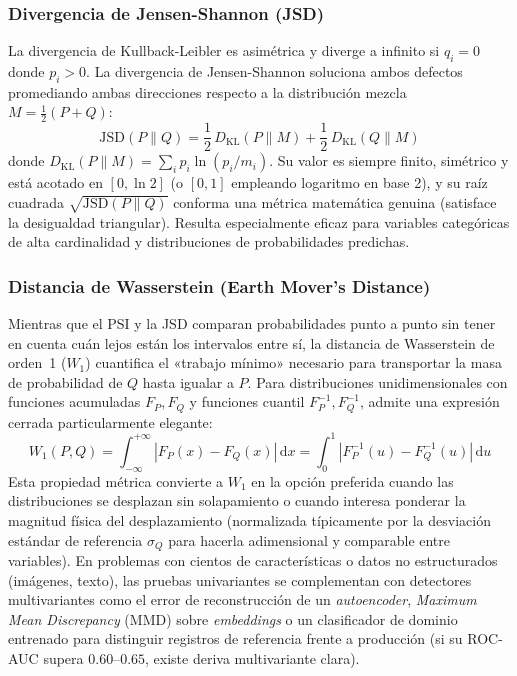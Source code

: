 \subsubsection{Divergencia de Jensen-Shannon (JSD)}

La divergencia de Kullback-Leibler es asimétrica y diverge a infinito si $q_i = 0$ donde $p_i > 0$. La divergencia de Jensen-Shannon soluciona ambos defectos promediando ambas direcciones respecto a la distribución mezcla $M = \frac{1}{2}(P + Q)$:
\begin{equation}\label{eq:jsd}
\text{JSD}(P \parallel Q) = \frac{1}{2}\, D_{\text{KL}}(P \parallel M) + \frac{1}{2}\, D_{\text{KL}}(Q \parallel M)
\end{equation}
donde $D_{\text{KL}}(P \parallel M) = \sum_i p_i \ln(p_i / m_i)$. Su valor es siempre finito, simétrico y está acotado en $[0, \ln 2]$ (o $[0, 1]$ empleando logaritmo en base 2), y su raíz cuadrada $\sqrt{\text{JSD}(P \parallel Q)}$ conforma una métrica matemática genuina (satisface la desigualdad triangular). Resulta especialmente eficaz para variables categóricas de alta cardinalidad y distribuciones de probabilidades predichas.

\subsubsection{Distancia de Wasserstein (Earth Mover's Distance)}

Mientras que el PSI y la JSD comparan probabilidades punto a punto sin tener en cuenta cuán lejos están los intervalos entre sí, la distancia de Wasserstein de orden~1 ($W_1$) cuantifica el «trabajo mínimo» necesario para transportar la masa de probabilidad de $Q$ hasta igualar a $P$. Para distribuciones unidimensionales con funciones acumuladas $F_P, F_Q$ y funciones cuantil $F_P^{-1}, F_Q^{-1}$, admite una expresión cerrada particularmente elegante:
\begin{equation}\label{eq:wasserstein}
W_1(P, Q) = \int_{-\infty}^{+\infty} \left| F_P(x) - F_Q(x) \right| \, \mathrm{d}x = \int_{0}^{1} \left| F_P^{-1}(u) - F_Q^{-1}(u) \right| \, \mathrm{d}u
\end{equation}
Esta propiedad métrica convierte a $W_1$ en la opción preferida cuando las distribuciones se desplazan sin solapamiento o cuando interesa ponderar la magnitud física del desplazamiento (normalizada típicamente por la desviación estándar de referencia $\sigma_Q$ para hacerla adimensional y comparable entre variables). En problemas con cientos de características o datos no estructurados (imágenes, texto), las pruebas univariantes se complementan con detectores multivariantes como el error de reconstrucción de un \textit{autoencoder}, \textit{Maximum Mean Discrepancy} (MMD) sobre \textit{embeddings} o un clasificador de dominio entrenado para distinguir registros de referencia frente a producción (si su ROC-AUC supera $0.60\text{--}0.65$, existe deriva multivariante clara).

